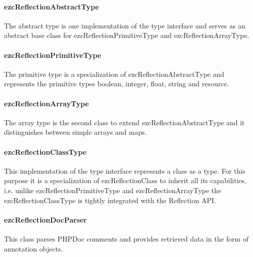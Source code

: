 \documentclass[10pt,final,a4paper,oneside]{article}
\begin{document}
\paragraph{ezcReflectionAbstractType}
The abstract type is one implementation of the type interface
and serves as an abstract base class
for ezcReflectionPrimitiveType and
ezcReflectionArrayType.

\paragraph{ezcReflectionPrimitiveType}
The primitive type is a specialization 
of ezcReflectionAbstractType
and represents the primitive types
boolean, integer, float, string and resource.

\paragraph{ezcReflectionArrayType}
The array type is the second class
to extend ezcReflectionAbstractType
and it distinguishes
between simple arrays and maps.

\paragraph{ezcReflectionClassType}
This implementation of the type interface
represents a class as a type.
For this purpose it is a specialization of ezcReflectionClass
to inherit all its capabilities,
i.e. unlike ezcReflectionPrimitiveType and ezcReflectionArrayType
the ezcReflectionClassType is tightly integrated with the Reflection API.


\paragraph{ezcReflectionDocParser}
This class parses PHPDoc comments
and provides retrieved data
in the form of annotation objects.
\end{document}
